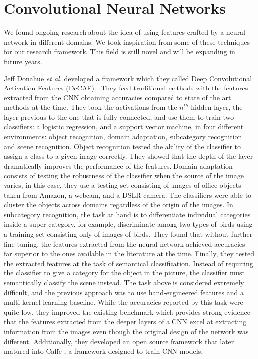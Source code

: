 \section{Convolutional Neural Networks}

We found ongoing research about the idea of using features crafted by a neural network in different domains. We took inspiration from some of these techniques for our research framework. This field is still novel and will be expanding in future years.

Jeff Donahue \textit{et al.} developed a framework which they called Deep Convolutional Activation Features (DeCAF) \cite{DBLP:journals/corr/DonahueJVHZTD13}. They feed traditional methods with the features extracted from the CNN obtaining accuracies compared to state of the art methods at the time. They took the activations from the $n^{th}$ hidden layer, the layer previous to the one that is fully connected, and use them to train two classifiers: a logistic regression, and a support vector machine, in four different environments: object recognition, domain adaptation, subcategory recognition and scene recognition. Object recognition tested the ability of the classifier to assign a class to a given image correctly. They showed that the depth of the layer dramatically improves the performance of the features. Domain adaptation consists of testing the robustness of the classifier when the source of the image varies, in this case, they use a testing-set consisting of images of office objects taken from Amazon, a webcam, and a DSLR camera. The classifiers were able to cluster the objects across domains regardless of the origin of the images. In subcategory recognition, the task at hand is to differentiate individual categories inside a super-category, for example, discriminate among two types of birds using a training set consisting only of images of birds. They found that without further fine-tuning, the features extracted from the neural network achieved accuracies far superior to the ones available in the literature at the time. Finally, they tested the extracted features at the task of semantical classification. Instead of requiring the classifier to give a category for the object in the picture, the classifier must semantically classify the scene instead. The task above is considered extremely difficult, and the previous approach was to use hand-engineered features and a multi-kernel learning baseline. While the accuracies reported by this task were quite low, they improved the existing benchmark which provides strong evidence that the features extracted from the deeper layers of a CNN excel at extracting information from the images even though the original design of the network was different. Additionally, they developed an open source framework that later matured into Caffe \cite{jia2014caffe}, a framework designed to train CNN models.\\


